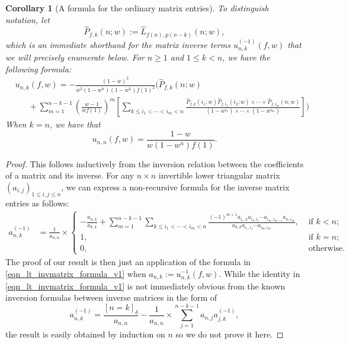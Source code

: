 \documentclass[12pt,reqno,a4letter]{article}
\numberwithin{figure}{section}
\numberwithin{table}{section}
\numberwithin{equation}{section}
\newcommand{\Iverson}[1]{\ensuremath{\left[#1\right]_{\delta}}}
\theoremstyle{plain}
\newtheorem{cor}[theorem]{Corollary}
\numberwithin{theorem}{section}
\theoremstyle{definition}
\begin{document}
\begin{cor}[A formula for the ordinary matrix entries] 
\label{cor_unkfw_ord_matrix_formula_v1} 
To distinguish notation, let $$\widehat{P}_{f,k}(n; w) := \widehat{L}_{f(n),p(n-k)}(n; w),$$ which is an 
immediate shorthand for the matrix inverse terms $u_{n,k}^{(-1)}(f, w)$ that we will precisely 
enumerate below. 
For $n \geq 1$ and $1 \leq k < n$, we have the following formula: 
\begin{align*} 
 & u_{n,k}(f, w) = -\frac{(1-w)^2}{w^2 (1-w^n)(1-w^k) f(1)^2}\Biggl( 
     \widehat{P}_{f,k}(n; w) \\ 
     & \phantom{=\ } + \sum_{m=1}^{n-k-1} 
     \left(\frac{w-1}{w f(1)}\right)^{m} \left[ 
     \sum_{k \leq i_1 < \cdots < i_m < n} \frac{\widehat{P}_{f,k}(i_1; w) 
     \widehat{P}_{f,i_1}(i_2; w) \times\cdots\times 
     \widehat{P}_{f,i_m}(n; w)}{ 
     (1-w^{i_1}) \times\cdots\times (1-w^{i_m})} 
     \right]\Biggr) 
\end{align*} 
When $k = n$, we have that 
$$u_{n,n}(f, w) = \frac{1-w}{w(1-w^n) f(1)}.$$ 
\end{cor} 
\begin{proof}
This follows inductively from the inversion relation between the coefficients of 
a matrix and its inverse. For any $n \times n$ invertible lower triangular 
matrix $(a_{i,j})_{1 \leq i,j \leq n}$, we can express a 
non-recursive formula for the inverse matrix entries as follows: 
\begin{align} 
\label{eqn_lt_invmatrix_formula_v1} 
a_{n,k}^{(-1)} & = \frac{1}{a_{n,n}} \times \begin{cases}
     -\frac{a_{n,k}}{a_{k,k}} + \sum\limits_{m=1}^{n-k-1} 
     \sum\limits_{k \leq i_1 < \cdots < i_m < n} \frac{(-1)^{m+1} 
     a_{i_1,k} a_{i_2,i_1} \cdots 
     a_{i_m,i_{m-1}} a_{n,i_m}}{a_{k,k} a_{i_1,i_1} \cdots 
     a_{i_m,i_m}}, & \text{ if $k < n$; } \\ 
     1, & \text{ if $k = n$; } \\ 
     0, & \text{ otherwise.} 
     \end{cases}
\end{align} 
The proof of our result is then just an application of the formula in 
\eqref{eqn_lt_invmatrix_formula_v1} when $a_{n,k} := u_{n,k}^{-1}(f, w)$. 
While the identity in \eqref{eqn_lt_invmatrix_formula_v1} is not immediately obvious 
from the known inversion formulas between inverse matrices in the form of 
\[
a_{n,k}^{(-1)} = \frac{\Iverson{n=k}}{a_{n,n}} - \frac{1}{a_{n,n}} \times 
     \sum_{j=1}^{n-k-1} a_{n,j} a_{j,k}^{(-1)}, 
\]
the result is easily obtained by induction on $n$ so we do not prove it here. 
\end{proof} 
\end{document}
